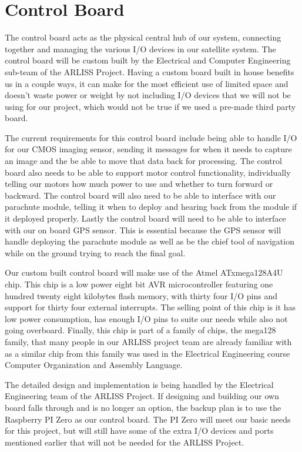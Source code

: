 \documentclass[10pt,letterpaper,onecolumn,journal]{IEEEtran}
\begin{document}
\section{Control Board}
\par
The control board acts as the physical central hub of our system, connecting together and managing the various I/O devices in our satellite system. The control board will be custom built by the Electrical and Computer Engineering sub-team of the ARLISS Project. Having a custom board built in house benefits us in a couple ways, it can make for the most efficient use of limited space and doesn't waste power or weight by not including I/O devices that we will not be using for our project, which would not be true if we used a pre-made third party board.\vspace{.3cm}
\par
The current requirements for this control board include being able to handle I/O for our CMOS imaging sensor, sending it messages for when it needs to capture an image and the be able to move that data back for processing. The control board also needs to be able to support motor control functionality, individually telling our motors how much power to use and whether to turn forward or backward. The control board will also need to be able to interface with our parachute module, telling it when to deploy and hearing back from the module if it deployed properly. Lastly the control board will need to be able to interface with our on board GPS sensor. This is essential because the GPS sensor will handle deploying the parachute module as well as be the chief tool of navigation while on the ground trying to reach the final goal.\vspace{.3cm}
\par
Our custom built control board will make use of the Atmel ATxmega128A4U chip. This chip is a low power eight bit AVR microcontroller featuring one hundred twenty eight kilobytes flash memory, with thirty four I/O pins and support for thirty four external interrupts\cite{ATxmega}. The selling point of this chip is it has low power consumption, has enough I/O pins to suite our needs while also not going overboard. Finally, this chip is part of a family of chips, the mega128 family, that many people in our ARLISS project team are already familiar with as a similar chip from this family was used in the Electrical Engineering course Computer Organization and Assembly Language.\vspace{.3cm}
\par
The detailed design and implementation is being handled by the Electrical Engineering team of the ARLISS Project. If designing and building our own board falls through and is no longer an option, the backup plan is to use the Raspberry PI Zero as our control board. The PI Zero will meet our basic needs for this project, but will still have some of the extra I/O devices and ports mentioned earlier that will not be needed for the ARLISS Project. 
\end{document}

